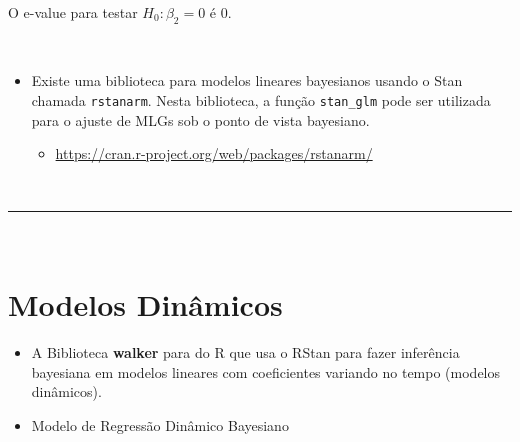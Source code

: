 \documentclass[
]{book}
\newenvironment{Shaded}{\begin{snugshade}}{\end{snugshade}}
\newcommand{\AttributeTok}[1]{\textcolor[rgb]{0.77,0.63,0.00}{#1}}
\newcommand{\CommentTok}[1]{\textcolor[rgb]{0.56,0.35,0.01}{\textit{#1}}}
\newcommand{\ConstantTok}[1]{\textcolor[rgb]{0.00,0.00,0.00}{#1}}
\newcommand{\ControlFlowTok}[1]{\textcolor[rgb]{0.13,0.29,0.53}{\textbf{#1}}}
\newcommand{\DecValTok}[1]{\textcolor[rgb]{0.00,0.00,0.81}{#1}}
\newcommand{\FunctionTok}[1]{\textcolor[rgb]{0.00,0.00,0.00}{#1}}
\newcommand{\NormalTok}[1]{#1}
\newcommand{\OtherTok}[1]{\textcolor[rgb]{0.56,0.35,0.01}{#1}}
\newcommand{\SpecialCharTok}[1]{\textcolor[rgb]{0.00,0.00,0.00}{#1}}
\providecommand{\tightlist}{%
  \setlength{\itemsep}{0pt}\setlength{\parskip}{0pt}}
\begin{document}
\begin{Shaded}
\end{Shaded}

O e-value para testar \(H_0: \beta_2=0\) é 0.

\(~\)

\begin{itemize}
\item
  Existe uma biblioteca para modelos lineares bayesianos usando o Stan chamada \texttt{rstanarm}. Nesta biblioteca, a função \texttt{stan\_glm} pode ser utilizada para o ajuste de MLGs sob o ponto de vista bayesiano.

  \begin{itemize}
  \tightlist
  \item
    \url{https://cran.r-project.org/web/packages/rstanarm/}
  \end{itemize}
\end{itemize}

\(~\)

\begin{center}\rule{0.5\linewidth}{0.5pt}\end{center}

\(~\)

\hypertarget{modelos-dinuxe2micos}{%
\section{Modelos Dinâmicos}\label{modelos-dinuxe2micos}}

\begin{itemize}
\item
  A Biblioteca \textbf{walker} para do R que usa o RStan para fazer inferência bayesiana em modelos lineares com coeficientes variando no tempo (modelos dinâmicos).
\item
  Modelo de Regressão Dinâmico Bayesiano
\end{itemize}
\end{document}

